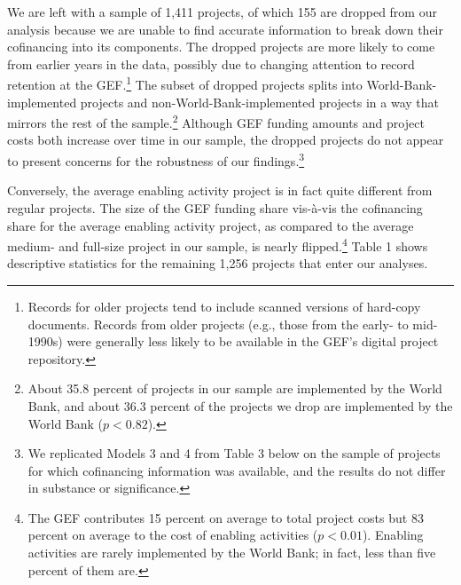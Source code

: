\documentclass{article}
\begin{document}
We are left with a sample of 1,411 projects, of which 155 are dropped from our analysis because we are unable to find accurate information to break down their cofinancing into its components.  The dropped projects are more likely to come from earlier years in the data, possibly due to changing attention to record retention at the GEF.\footnote{Records for older projects tend to include scanned versions of hard-copy documents.  Records from older projects (e.g., those from the early- to mid-1990s) were generally less likely to be available in the GEF’s digital project repository.}  The subset of dropped projects splits into World-Bank-implemented projects and non-World-Bank-implemented projects in a way that mirrors the rest of the sample.\footnote{About 35.8 percent of projects in our sample are implemented by the World Bank, and about 36.3 percent of the projects we drop are implemented by the World Bank ($p < 0.82$). }   Although GEF funding amounts and project costs both increase over time in our sample, the dropped projects do not appear to present concerns for the robustness of our findings.\footnote{We replicated Models 3 and 4 from Table 3 below on the sample of projects for which cofinancing information was available, and the results do not differ in substance or significance.}
  
Conversely, the average enabling activity project is in fact quite different from regular projects.  The size of the GEF funding share vis-à-vis the cofinancing share for the average enabling activity project, as compared to the average medium- and full-size project in our sample, is nearly flipped.\footnote{The GEF contributes 15 percent on average to total project costs but 83 percent on average to the cost of enabling activities ($p < 0.01$).  Enabling activities are rarely implemented by the World Bank; in fact, less than five percent of them are.}   Table 1 shows descriptive statistics for the remaining 1,256 projects that enter our analyses.
\end{document}
